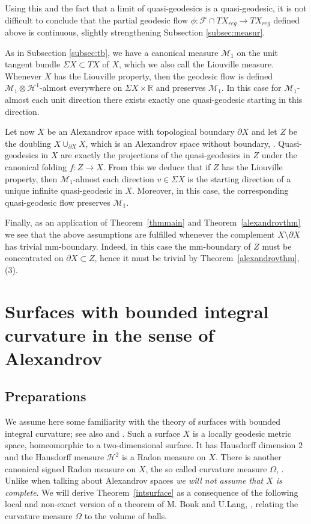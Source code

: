 \documentclass[12pt,leqno,intlimits]{amsart}
\numberwithin{equation}{section}
\theoremstyle{definition}
\theoremstyle{remark}
\newcommand{\tref}[1]{Theorem~\ref{#1}}
\newcommand{\R}{\mathbb{R}}
\def\:{\colon}
\begin{document}
Using this and the fact that a limit of quasi-geodesics is a quasi-geodesic, it is not difficult to conclude that the partial geodesic flow $\phi\:\mathcal F\cap TX_{reg} \to TX_{reg}$ defined above is continuous, slightly strengthening Subsection \ref{subsec:measur}.


As in Subsection \ref{subsec:tb}, we have a canonical measure $\mathcal M _1$   on the unit tangent bundle $\Sigma X \subset TX $ of $X$, which we also call the Liouville measure. Whenever
$X$ has the Liouville property, then the geodesic flow is defined $\mathcal M_1\otimes \mathcal H^1$-almost everywhere on $\Sigma X \times \R$ and preserves $\mathcal M_1$.  In this case    for $\mathcal M_1$-almost each unit direction there exists exactly one quasi-geodesic starting in this direction.

Let now $X$ be an  Alexandrov space with topological boundary $\partial X$ and let $Z$ be the doubling $X\cup _{\partial X} X$, which
is an Alexandrov space without boundary, \cite{P2}. Quasi-geodesics in $X$ are exactly the projections of the quasi-geodesics in $Z$ under
the canonical folding $f\:Z\to X$.   From this we deduce that if $Z$ has the Liouville property, then $\mathcal M_1$-almost each  direction $v\in \Sigma X$ is the starting direction of a unique infinite quasi-geodesic in $X$. Moreover, in this case,  the corresponding quasi-geodesic flow preserves $\mathcal M_1$.

Finally, as an application of \tref{thmmain} and \tref{alexandrovthm} we see that the above assumptions are fulfilled whenever the complement $X\setminus\partial X$ has trivial mm-boundary. Indeed, in this case the mm-boundary of $Z$ must be concentrated on $\partial X \subset Z$, hence it must be trivial by \tref{alexandrovthm},(3).



\section{Surfaces with bounded integral curvature in the sense of Alexandrov} \label{sec:surface}
\subsection{Preparations} We assume here some  familiarity  with the theory of surfaces with bounded integral curvature; see also \cite{AZ} and
 \cite{Reshetnyak-GeomIV}.  Such a surface $X$ is a locally geodesic metric space, homeomorphic to a two-dimensional surface.  It has Hausdorff dimension $2$  and  the Hausdorff measure $\mathcal H^2$ is a Radon measure  on $X$.   There is another canonical signed Radon measure on $X$, the so called curvature measure $\Omega$, \cite[Section 8]{Reshetnyak-GeomIV}. Unlike when talking about Alexandrov spaces \emph{we will not assume that $X$ is complete}.
 We will derive  \tref{intsurface} as a consequence of the following local and non-exact version of a theorem of M. Bonk and U.Lang, \cite{Bonk-Lang}, relating the curvature measure $\Omega$ to the volume of balls.
\end{document}
